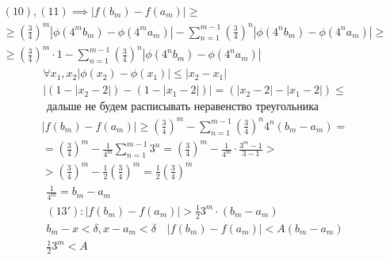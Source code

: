 \documentclass[main]{subfiles}
\begin{document}
\begin{example}
\begin{multline*}
          (10), (11) \implies |f(b_m) - f(a_m)|  \geq \\ \geq \left( \frac{3}{4} \right)^m |\phi(4^mb_m) - \phi(4^ma_m)|
          -\sum_{n=1}^{m-1} \left( \frac{3}{4} \right)^n | \phi(4^nb_m) - \phi(4^na_m)| \geq \\
           \geq   \left( \frac{3}{4} \right)^m \cdot 1 
          - \sum^{m-1}_{n=1} \left( \frac{3}{4} \right)^n |\phi(4^nb_m)-\phi(4^na_m)|\end{multline*}
          \begin{gather*}
          \forall x_1, x_2 |\phi(x_2) - \phi(x_1)| \leq |x_2 -x_1| \tag{12} \\
          |(1-|x_2-2|) - (1-|x_1-2|)| = (|x_2-2| - |x_1-2|) \leq \\
          \text{ дальше не будем расписывать неравенство треугольника} 
          \end{gather*}
          \begin{multline*}
  |f(b_m) - f(a_m)| \geq \left( \frac{3}{4} \right)^m - \sum_{n=1}^{m-1} \left( \frac{3}{4} \right)^n
          4^n(b_m - a_m) =\\
          = \left( \frac{3}{4} \right)^m - \frac{1}{4^m} \sum_{n=1}^{m-1}3^n =
          \left( \frac{3}{4} \right)^m - \frac{1}{4^m} \cdot \frac{3^m-1}{3-1} > \\ 
          > \left( \frac{3}{4} \right)^m - \frac{1}{2} \left( \frac{3}{4} \right)^m
          = \frac{1}{2} \left( \frac{3}{4} \right)^m \tag{13} \end{multline*}
          \begin{gather*}
          \frac{1}{4^m} = b_m - a_m \\
          (13\prime) : |f(b_m) - f(a_m)| > \frac{1}{2} 3^m \cdot (b_m-a_m) \\
          b_m - x < \delta, x - a_m < \delta \quad |f(b_m) - f(a_m)| < A (b_m-a_m) \\
          \frac{1}{2} 3^m < A
     \end{gather*} 
\end{example}
\end{document}
